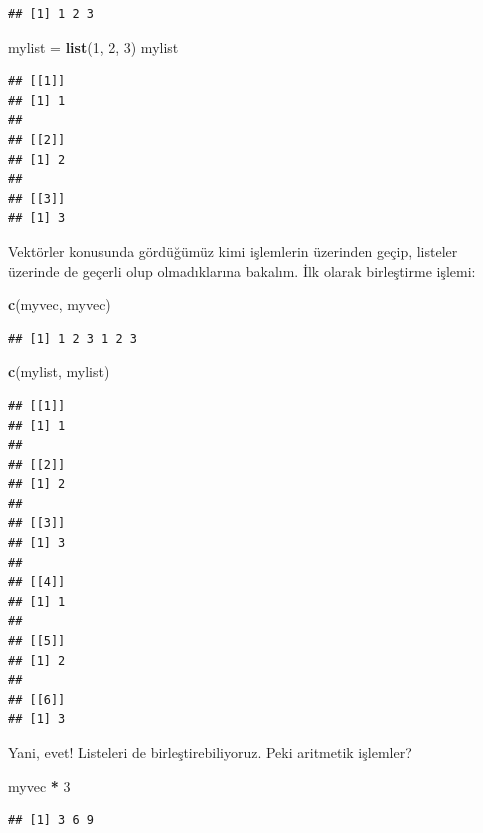 \documentclass[]{book}
\newenvironment{Shaded}{\begin{snugshade}}{\end{snugshade}}
\newcommand{\DecValTok}[1]{\textcolor[rgb]{0.00,0.00,0.81}{#1}}
\newcommand{\KeywordTok}[1]{\textcolor[rgb]{0.13,0.29,0.53}{\textbf{#1}}}
\newcommand{\NormalTok}[1]{#1}
\newcommand{\OperatorTok}[1]{\textcolor[rgb]{0.81,0.36,0.00}{\textbf{#1}}}
\newcommand{\StringTok}[1]{\textcolor[rgb]{0.31,0.60,0.02}{#1}}
\begin{document}
\begin{verbatim}
## [1] 1 2 3
\end{verbatim}

\begin{Shaded}
\begin{Highlighting}[]
\NormalTok{mylist =}\StringTok{ }\KeywordTok{list}\NormalTok{(}\DecValTok{1}\NormalTok{, }\DecValTok{2}\NormalTok{, }\DecValTok{3}\NormalTok{)}
\NormalTok{mylist}
\end{Highlighting}
\end{Shaded}

\begin{verbatim}
## [[1]]
## [1] 1
## 
## [[2]]
## [1] 2
## 
## [[3]]
## [1] 3
\end{verbatim}

Vektörler konusunda gördüğümüz kimi işlemlerin üzerinden geçip, listeler
üzerinde de geçerli olup olmadıklarına bakalım. İlk olarak birleştirme
işlemi:

\begin{Shaded}
\begin{Highlighting}[]
\KeywordTok{c}\NormalTok{(myvec, myvec)}
\end{Highlighting}
\end{Shaded}

\begin{verbatim}
## [1] 1 2 3 1 2 3
\end{verbatim}

\begin{Shaded}
\begin{Highlighting}[]
\KeywordTok{c}\NormalTok{(mylist, mylist)}
\end{Highlighting}
\end{Shaded}

\begin{verbatim}
## [[1]]
## [1] 1
## 
## [[2]]
## [1] 2
## 
## [[3]]
## [1] 3
## 
## [[4]]
## [1] 1
## 
## [[5]]
## [1] 2
## 
## [[6]]
## [1] 3
\end{verbatim}

Yani, evet! Listeleri de birleştirebiliyoruz. Peki aritmetik işlemler?

\begin{Shaded}
\begin{Highlighting}[]
\NormalTok{myvec }\OperatorTok{*}\StringTok{ }\DecValTok{3}
\end{Highlighting}
\end{Shaded}

\begin{verbatim}
## [1] 3 6 9
\end{verbatim}
\end{document}
